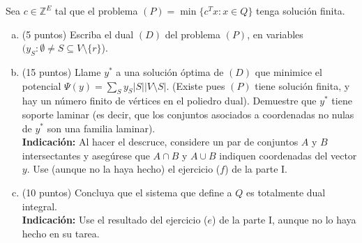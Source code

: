 \documentclass{article}
\newcommand{\ZZ}{\mathbb Z}
\theoremstyle{plain}
\theoremstyle{definition}
\theoremstyle{Azul}
\begin{document}
Sea $c\in \ZZ^E$ tal que el problema $(P)=\min \{c^Tx\colon x\in Q\}$ tenga solución finita. 
\begin{enumerate}[(a)]
\item (5 puntos) Escriba el dual $(D)$ del problema $(P)$, en variables $(y_S\colon \emptyset \neq S \subseteq V\setminus \{r\}$).
\item (15 puntos) Llame $y^*$ a una solución óptima de $(D)$ que minimice el potencial $\Psi(y)=\sum_{S} y_S |S||V\setminus S|$. (Existe pues $(P)$ tiene solución finita, y hay un número finito de vértices en el poliedro dual). Demuestre que $y^*$ tiene soporte laminar (es decir, que los conjuntos asociados a coordenadas no nulas de $y^*$ son una familia laminar).\\
\textbf{Indicación:} Al hacer el descruce, considere un par de conjuntos $A$ y $B$ intersectantes y asegúrese que $A\cap B$ y $A\cup B$ indiquen coordenadas del vector $y$.
Use (aunque no la haya hecho) el ejercicio ($f$) de la parte I. 
\item (10 puntos) Concluya que el sistema que define a $Q$ es totalmente dual integral.\\
\textbf{Indicación:} Use el resultado del ejercicio ($e$) de la parte I, aunque no lo haya hecho en su tarea.
\end{enumerate}



	
\end{document}
